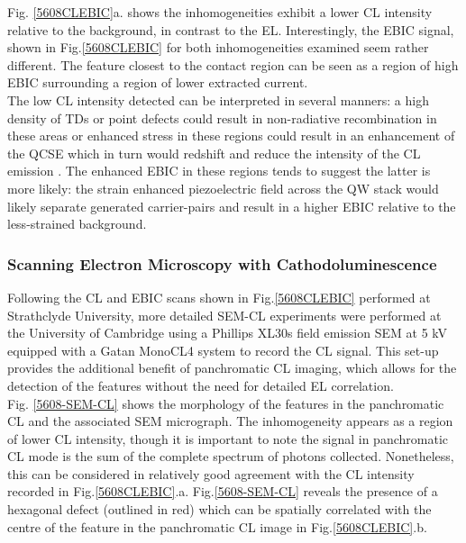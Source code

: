 Fig. \ref{5608CLEBIC}a. shows the inhomogeneities exhibit a lower CL intensity relative to the background, in contrast to the EL. Interestingly, the EBIC signal, shown in Fig.\ref{5608CLEBIC} for both inhomogeneities examined seem rather different. The feature closest to the contact region can be seen as a region of high EBIC surrounding a region of lower extracted current. \\
The low CL intensity detected can be interpreted in several manners: a high density of TDs or point defects could result in non-radiative recombination in these areas \cite{Polyakov1998,Bennett2010b} or enhanced stress in these regions could result in an enhancement of the QCSE which in turn would redshift and reduce the intensity of the CL emission \cite{Ren2015,Ryou2009}. The enhanced EBIC in these regions tends to suggest the latter is more likely: the strain enhanced piezoelectric field across the QW stack would likely separate generated carrier-pairs \cite{Chichibu1999} and result in a higher EBIC relative to the less-strained background. 

\subsubsection{Scanning Electron Microscopy with Cathodoluminescence}

Following the CL and EBIC scans shown in Fig.\ref{5608CLEBIC} performed at Strathclyde University, more detailed SEM-CL experiments were performed at the University of Cambridge using a Phillips XL30s field emission SEM at 5 kV equipped with a Gatan MonoCL4 system to record the CL signal. This set-up provides the additional benefit of panchromatic CL imaging, which allows for the detection of the features without the need for detailed EL correlation.\\
Fig. \ref{5608-SEM-CL} shows the morphology of the features in the panchromatic CL and the associated SEM micrograph. The inhomogeneity appears as a region of lower CL intensity, though it is important to note the signal in panchromatic CL mode is the sum of the complete spectrum of photons collected. Nonetheless, this can be considered in relatively good agreement with the CL intensity recorded in Fig.\ref{5608CLEBIC}.a. Fig.\ref{5608-SEM-CL} reveals the presence of a hexagonal defect (outlined in red) which can be spatially correlated with the centre of the feature in the panchromatic CL image in Fig.\ref{5608CLEBIC}.b.

